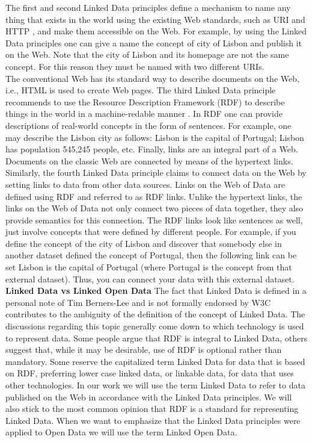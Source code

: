 \documentclass[a4paper,12pt,oneside]{report}
\begin{document}
{{{{The first and second Linked Data principles define a mechanism to name any thing that exists in the world using the existing Web standards, such as URI and HTTP , and make them accessible
on the Web. For example, by using the Linked Data principles one can give a name the concept of city of Lisbon and publish it on the Web. Note that the city of Lisbon and its homepage are not the same concept. For this reason they must be named with two
different URIs.\\
The conventional Web has its standard way to describe documents on the Web, i.e., HTML is used to create Web pages. The third Linked Data principle recommends to use the Resource Description Framework (RDF) to describe things in the world in a machine-redable manner . In RDF one can provide descriptions of real-world concepts in the form of sentences. For example, one may describe the Lisbon city as follows: Lisbon is the capital of Portugal; Lisbon has population 545,245 people, etc.
Finally, links are an integral part of a Web. Documents on the classic Web are connected by means of the hypertext links. Similarly, the fourth Linked Data principle claims to connect data on the Web by setting links to data from other data sources.
Links on the Web of Data are defined using RDF and referred to as RDF links. Unlike the hypertext links, the links on the Web of Data not only connect two pieces of data together, they also provide semantics for this connection. The RDF links look like sentences as well, just involve concepts that were defined by different people. For example, if you define the concept of the city of Lisbon and discover that somebody else in another dataset defined the concept of Portugal, then the following link can be set Lisbon is the capital of Portugal (where Portugal is the concept from that external dataset). Thus, you can connect your data with this external dataset.\\
\textbf{Linked Data vs Linked Open Data} The fact that Linked Data is defined in a personal note of Tim Berners-Lee and is not formally endorsed by W3C contributes to the ambiguity of the definition of the concept of Linked Data. The discussions regarding this
topic generally come down to which technology is used to represent data. Some people argue that RDF is integral to Linked Data, others suggest that, while it may be desirable, use of RDF is optional rather than mandatory. Some reserve the capitalized term
Linked Data for data that is based on RDF, preferring lower case linked data, or linkable data, for data that uses other technologies. In our work we will use the term Linked Data
to refer to data published on the Web in accordance with the Linked Data principles. We will also stick to the most common opinion that RDF is a standard for representing Linked Data. When we want to emphasize that the Linked Data principles were
applied to Open Data we will use the term Linked Open Data.}
}}}
\end{document}
